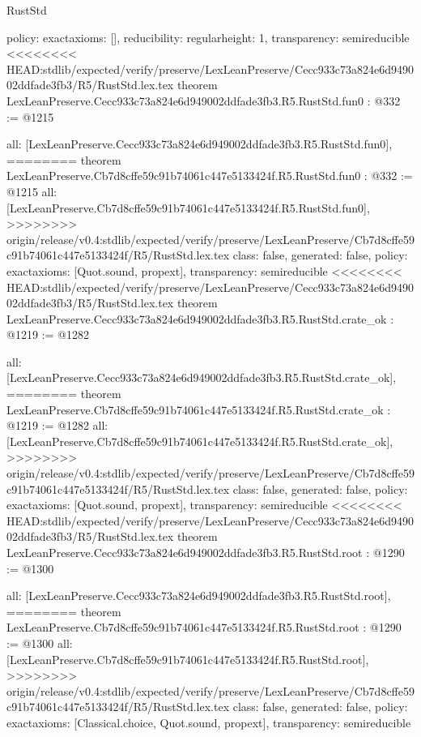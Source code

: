 \begin{lexlean}{RustStd}
\begin{coremodule}
{\begin{coremodule}
{{{  policy: exact{axioms: []},
  reducibility: regular{height: 1},
  transparency: semireducible
}
<<<<<<<< HEAD:stdlib/expected/verify/preserve/LexLeanPreserve/Cecc933c73a824e6d949002ddfade3fb3/R5/RustStd.lex.tex
theorem LexLeanPreserve.Cecc933c73a824e6d949002ddfade3fb3.R5.RustStd.fun0 : @332 := @1215 {
  all: [LexLeanPreserve.Cecc933c73a824e6d949002ddfade3fb3.R5.RustStd.fun0],
========
theorem LexLeanPreserve.Cb7d8cffe59c91b74061c447e5133424f.R5.RustStd.fun0 : @332 := @1215 {
  all: [LexLeanPreserve.Cb7d8cffe59c91b74061c447e5133424f.R5.RustStd.fun0],
>>>>>>>> origin/release/v0.4:stdlib/expected/verify/preserve/LexLeanPreserve/Cb7d8cffe59c91b74061c447e5133424f/R5/RustStd.lex.tex
  class: false,
  generated: false,
  policy: exact{axioms: [Quot.sound, propext]},
  transparency: semireducible
}
<<<<<<<< HEAD:stdlib/expected/verify/preserve/LexLeanPreserve/Cecc933c73a824e6d949002ddfade3fb3/R5/RustStd.lex.tex
theorem LexLeanPreserve.Cecc933c73a824e6d949002ddfade3fb3.R5.RustStd.crate_ok : @1219 := @1282 {
  all: [LexLeanPreserve.Cecc933c73a824e6d949002ddfade3fb3.R5.RustStd.crate_ok],
========
theorem LexLeanPreserve.Cb7d8cffe59c91b74061c447e5133424f.R5.RustStd.crate_ok : @1219 := @1282 {
  all: [LexLeanPreserve.Cb7d8cffe59c91b74061c447e5133424f.R5.RustStd.crate_ok],
>>>>>>>> origin/release/v0.4:stdlib/expected/verify/preserve/LexLeanPreserve/Cb7d8cffe59c91b74061c447e5133424f/R5/RustStd.lex.tex
  class: false,
  generated: false,
  policy: exact{axioms: [Quot.sound, propext]},
  transparency: semireducible
}
<<<<<<<< HEAD:stdlib/expected/verify/preserve/LexLeanPreserve/Cecc933c73a824e6d949002ddfade3fb3/R5/RustStd.lex.tex
theorem LexLeanPreserve.Cecc933c73a824e6d949002ddfade3fb3.R5.RustStd.root : @1290 := @1300 {
  all: [LexLeanPreserve.Cecc933c73a824e6d949002ddfade3fb3.R5.RustStd.root],
========
theorem LexLeanPreserve.Cb7d8cffe59c91b74061c447e5133424f.R5.RustStd.root : @1290 := @1300 {
  all: [LexLeanPreserve.Cb7d8cffe59c91b74061c447e5133424f.R5.RustStd.root],
>>>>>>>> origin/release/v0.4:stdlib/expected/verify/preserve/LexLeanPreserve/Cb7d8cffe59c91b74061c447e5133424f/R5/RustStd.lex.tex
  class: false,
  generated: false,
  policy: exact{axioms: [Classical.choice, Quot.sound, propext]},
  transparency: semireducible
}

}}}}}
\end{coremodule}}
\end{coremodule}
\end{lexlean}
